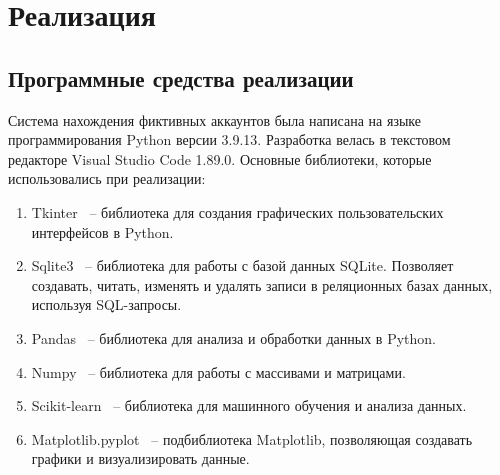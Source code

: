 \lstset{language=C, frame=L, basicstyle=\footnotesize,%
	keywordstyle=\bfseries, showstringspaces=false, xleftmargin=\parindent, numbers=none, numberstyle=\tiny, stepnumber=2, numbersep=5pt}
\newpage
\section{Реализация}

\label{sec:Realisation}
\subsection{Программные средства реализации}
Система нахождения фиктивных аккаунтов была написана на языке программирования Python версии 3.9.13. Разработка велась в текстовом редакторе Visual Studio Code 1.89.0. Основные библиотеки, которые использовались при реализации:

\begin{enumerate}[itemindent=2cm, leftmargin=0cm, labelsep=0.3cm, topsep=0cm, itemsep=0cm, parsep=0cm, label=\arabic*., after=\vspace{-0.1cm}, before=\vspace{-0.1cm}]
    \item Tkinter~\cite{tkinter} -- библиотека для создания графических пользовательских интерфейсов в Python.
    \item Sqlite3~\cite{sqlite3} -- библиотека для работы с базой данных SQLite. Позволяет создавать, читать, изменять и удалять записи в реляционных базах данных, используя SQL-запросы.
    \item Pandas~\cite{pandas} -- библиотека для анализа и обработки данных в Python.
    \item Numpy~\cite{numpy} -- библиотека для работы с массивами и матрицами.
    \item Scikit-learn~\cite{scikit-learn} -- библиотека для машинного обучения и анализа данных.
    \item Matplotlib.pyplot~\cite{maptolib} -- подбиблиотека Matplotlib, позволяющая создавать графики и визуализировать данные.
\end{enumerate}
\vspace{1.5em}

